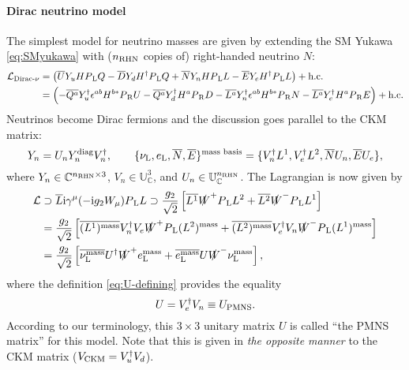 \documentclass[CheatSheet]{subfiles}
\begin{document}
\paragraph{Dirac neutrino model}
The simplest model for neutrino masses are given by extending the SM Yukawa \eqref{eq:SMyukawa} with ($n\w{RHN}$ copies of) right-handed neutrino $N$:
\begin{align}
   \mathcal L\w*{Dirac-$\nu$}&=
\left(  \overline{U}\Yu H \PL Q
- \overline{D}\Yd H^\dagger \PL Q
+ \overline{N}\Yn H \PL L
- \overline{E}\Ye H^\dagger \PL L
\right)+ \text{h.c.}
\\&=
\left(- \overline{Q^a}\Yu^\dagger \epsilon^{ab}H^{b*} \PR U
- \overline{Q^a}\Yd^\dagger H^{a} \PR D
- \overline{L^a}\Yn^\dagger \epsilon^{ab}H^{b*} \PR N
- \overline{L^a}\Ye^\dagger H^{a} \PR E
\right) + \text{h.c.}
\end{align}
Neutrinos become Dirac fermions and the discussion goes parallel to the CKM matrix:
\begin{equation}
 Y_{n} = U_n Y_n^{\text{diag}} V_n^\dagger,\qquad
\{\nu_{\mathrm{L}}, e_{\mathrm{L}}, \overline N, \overline E\}^{\text{mass basis}} = \{V_n^\dagger L^1, V_e^\dagger L^2, \overline N U_n, \overline E U_e\},
\end{equation}
where  $\Yn\in\mathbb C^{n\w{RHN}\times3}$, $V_n\in\mathbb U_{\mathbb C}^3$, and $U_n\in\mathbb U_{\mathbb C}^{n\w{RHN}}$.
The Lagrangian is now given by
\begin{align}
 \mathcal L&\supset\overline{L}{\mathrm{i}}\gamma^\mu(-{\mathrm{i}} g_2 W_\mu)P_{\,\mathrm L} L
\supset
\frac{g_2}{\sqrt2}\left[
\overline{L^1} \slashed W^+P_{\,\mathrm L} L^2
+\overline{L^2}\slashed W^-P_{\,\mathrm L} L^1
\right]
\\&=
\frac{g_2}{\sqrt2}\left[
\overline{(L^1)^{\text{mass}}} V_n^\dagger V_e\slashed W^+P_{\,\mathrm L} (L^2)^{\text{mass}}
+\overline{(L^2)^{\text{mass}}}V_e^\dagger V_n\slashed W^-P_{\,\mathrm L}(L^1)^{\text{mass}}
\right]
\\&=
\frac{g_2}{\sqrt2}\left[
\overline{\nu_{\mathrm{L}}^{\text{mass}}} U^\dagger\slashed W^+e_{\mathrm{L}}^{\text{mass}}
+\overline{e_{\mathrm{L}}^{\text{mass}}}U\slashed W^-\nu_{\mathrm{L}}^{\text{mass}}
\right],
\end{align}
where the definition \eqref{eq:U-defining} provides the equality
\begin{equation}
 U=V_e^\dagger V_n\equiv U\w{PMNS}.
\end{equation}
According to our terminology, this $3\times 3$ unitary matrix $U$ is called ``the PMNS matrix'' for this model.
Note that this is given in \emph{the opposite manner} to the CKM matrix ($V\w{CKM}=V_u^\dagger V_d$).
\end{document}

